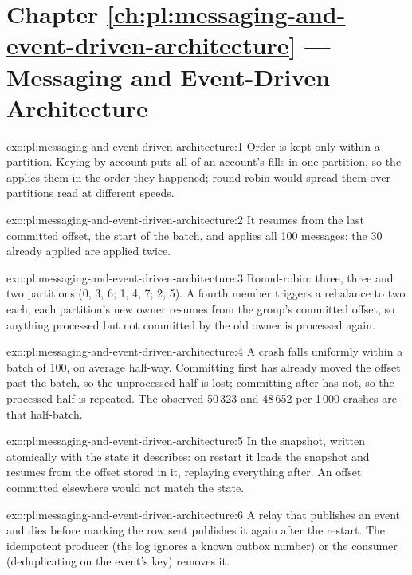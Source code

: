 \section*{Chapter \ref{ch:pl:messaging-and-event-driven-architecture} --- Messaging and Event-Driven Architecture}

\begin{solution}{exo:pl:messaging-and-event-driven-architecture:1}
Order is kept only within a partition. Keying by account puts all of an account's fills in one partition, so the  applies
them in the order they happened; round-robin would spread them over partitions read at different speeds.
\end{solution}

\begin{solution}{exo:pl:messaging-and-event-driven-architecture:2}
It resumes from the last committed offset, the start of the batch, and applies all 100 messages: the 30 already applied are applied twice.
\end{solution}

\begin{solution}{exo:pl:messaging-and-event-driven-architecture:3}
Round-robin: three, three and two partitions (0, 3, 6; 1, 4, 7; 2, 5). A fourth member triggers a rebalance to two each; each partition's new
owner resumes from the group's committed offset, so anything processed but not committed by the old owner is processed again.
\end{solution}

\begin{solution}{exo:pl:messaging-and-event-driven-architecture:4}
A crash falls uniformly within a batch of 100, on average half-way. Committing first has already moved the offset past the batch, so the
unprocessed half is lost; committing after has not, so the processed half is repeated. The observed 50\,323 and 48\,652 per 1\,000 crashes
are that half-batch.
\end{solution}

\begin{solution}{exo:pl:messaging-and-event-driven-architecture:5}
In the snapshot, written atomically with the state it describes: on restart it loads the snapshot and resumes from the offset stored in it,
replaying everything after. An offset committed elsewhere would not match the state.
\end{solution}

\begin{solution}{exo:pl:messaging-and-event-driven-architecture:6}
A relay that publishes an event and dies before marking the row sent publishes it again after the restart. The idempotent producer (the log
ignores a known outbox number) or the consumer (deduplicating on the event's key) removes it.
\end{solution}

